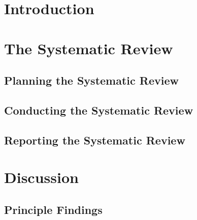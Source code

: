 \documentclass{sig-alternate}
\begin{document}
\linespread{0.95}



\linespread{0.95}
\section{Introduction}
	

%	
%		
	
\linespread{0.95}
\section{The Systematic Review}\label{method}
	
	\linespread{0.95}
	\subsection{Planning the Systematic Review\label{planning}}
		
		\linespread{0.95}
	\subsection{Conducting the Systematic Review\label{conducting}}
		
%			
\linespread{0.95}
	\subsection{Reporting the Systematic Review\label{reporting}}
		
\linespread{0.95}
\section{Discussion}
	
\linespread{0.95}
\subsection{Principle Findings} %
	
\end{document}
